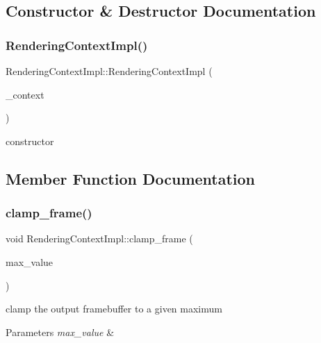 \subsection{Constructor \& Destructor Documentation}
\mbox{\label{struct_rendering_context_impl_a03c8ddb57af7c91c41637c7fd0467b3b}} 
\subsubsection{\texorpdfstring{Rendering\+Context\+Impl()}{RenderingContextImpl()}}
{\footnotesize\ttfamily Rendering\+Context\+Impl\+::\+Rendering\+Context\+Impl (\begin{DoxyParamCaption}\item[{\hyperlink{struct_rendering_context}{Rendering\+Context} $\ast$}]{\+\_\+context }\end{DoxyParamCaption})\hspace{0.3cm}{\ttfamily [inline]}}

constructor 

\subsection{Member Function Documentation}
\mbox{\label{struct_rendering_context_impl_af0fb958dc3632540d622ad580487ef1f}} 
\subsubsection{\texorpdfstring{clamp\+\_\+frame()}{clamp\_frame()}}
{\footnotesize\ttfamily void Rendering\+Context\+Impl\+::clamp\+\_\+frame (\begin{DoxyParamCaption}\item[{const float}]{max\+\_\+value }\end{DoxyParamCaption})}

clamp the output framebuffer to a given maximum


\begin{DoxyParams}{Parameters}
{\em max\+\_\+value} & \\
\hline
\end{DoxyParams}
\mbox{\label{struct_rendering_context_impl_af2a6da1af1cbc483eeeb47ac63bcb30c}} 
